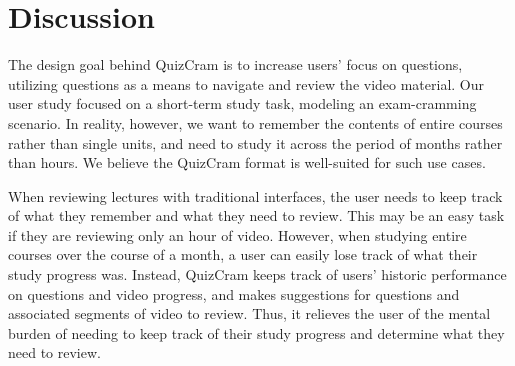 \documentclass{chi-ext}
\begin{document}



\section{Discussion}

The design goal behind QuizCram is to increase users' focus on questions, utilizing questions as a means to navigate and review the video material. Our user study focused on a short-term study task, modeling an exam-cramming scenario. In reality, however, we want to remember the contents of entire courses rather than single units, and need to study it across the period of months rather than hours. We believe the QuizCram format is well-suited for such use cases.

When reviewing lectures with traditional interfaces, the user needs to keep track of what they remember and what they need to review. This may be an easy task if they are reviewing only an hour of video. However, when studying entire courses over the course of a month, a user can easily lose track of what their study progress was. Instead, QuizCram keeps track of users' historic performance on questions and video progress, and makes suggestions for questions and associated segments of video to review. Thus, it relieves the user of the mental burden of needing to keep track of their study progress and determine what they need to review.
\end{document}
